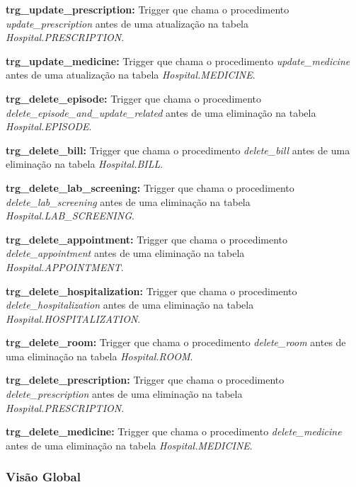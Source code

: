 \vspace{0.15cm}
\textbf{trg\_update\_prescription:} Trigger que chama o procedimento \textit{update\_prescription} antes de uma atualização na tabela \textit{Hospital.PRESCRIPTION}.

\vspace{0.15cm}
\textbf{trg\_update\_medicine:} Trigger que chama o procedimento \textit{update\_medicine} antes de uma atualização na tabela \textit{Hospital.MEDICINE}.

\vspace{0.15cm}
\textbf{trg\_delete\_episode:} Trigger que chama o procedimento \textit{delete\_episode\_and\_update\_related} antes de uma eliminação na tabela \textit{Hospital.EPISODE}.

\vspace{0.15cm}
\textbf{trg\_delete\_bill:} Trigger que chama o procedimento \textit{delete\_bill} antes de uma eliminação na tabela \textit{Hospital.BILL}.

\vspace{0.15cm}
\textbf{trg\_delete\_lab\_screening:} Trigger que chama o procedimento \textit{delete\_lab\_screening} antes de uma eliminação na tabela \textit{Hospital.LAB\_SCREENING}.

\vspace{0.15cm}
\textbf{trg\_delete\_appointment:} Trigger que chama o procedimento \textit{delete\_appointment} antes de uma eliminação na tabela \textit{Hospital.APPOINTMENT}.

\vspace{0.15cm}
\textbf{trg\_delete\_hospitalization:} Trigger que chama o procedimento \textit{delete\_hospitalization} antes de uma eliminação na tabela \textit{Hospital.HOSPITALIZATION}.

\vspace{0.15cm}
\textbf{trg\_delete\_room:} Trigger que chama o procedimento \textit{delete\_room} antes de uma eliminação na tabela \textit{Hospital.ROOM}.

\vspace{0.15cm}
\textbf{trg\_delete\_prescription:} Trigger que chama o procedimento \textit{delete\_prescription} antes de uma eliminação na tabela \textit{Hospital.PRESCRIPTION}.

\vspace{0.15cm}
\textbf{trg\_delete\_medicine:} Trigger que chama o procedimento \textit{delete\_medicine} antes de uma eliminação na tabela \textit{Hospital.MEDICINE}.

\subsubsection{Visão Global}

